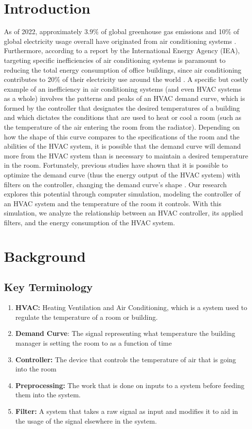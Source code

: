 \documentclass[conference,letterpaper]{IEEEtran}
\begin{document}
\section{Introduction}
\label{sec:Introduction}
As of 2022, approximately $3.9\%$ of global greenhouse gas emissions and 10\% of global electricity usage overall have originated from air conditioning systems \cite{woods_humiditys_2022}. Furthermore, according to a report by the International Energy Agency (IEA), targeting specific inefficiencies of air conditioning systems is paramount to reducing the total energy consumption of office buildings, since air conditioning contributes to 20\% of their electricity use around the world \cite{IEA_Future}. A specific but costly example of an inefficiency in air conditioning systems (and even HVAC systems as a whole) involves the patterns and peaks of an HVAC demand curve, which is formed by the controller that designates the desired temperatures of a building and which dictates the conditions that are used to heat or cool a room (such as the temperature of the air entering the room from the radiator). Depending on how the shape of this curve compares to the specifications of the room and the abilities of the HVAC system, it is possible that the demand curve will demand more from the HVAC system than is necessary to maintain a desired temperature in the room. Fortunately, previous studies have shown that it is possible to optimize the demand curve (thus the energy output of the HVAC system) with filters on the controller, changing the demand curve's shape \cite{6687952} . Our research explores this potential through computer simulation, modeling the controller of an HVAC system and the temperature of the room it controls. With this simulation, we analyze the relationship between an HVAC controller, its applied filters, and the energy consumption of the HVAC system. 

\section{Background}
\label{sec:Background}
\subsection{Key Terminology}
\begin{enumerate}
    \item \textbf{HVAC:} Heating Ventilation and Air Conditioning, which is a system used to regulate the temperature of a room or building.
\item \textbf{Demand Curve}: The signal representing what temperature the building manager is setting the room to as a function of time
\item \textbf{Controller:} The device that controls the temperature of air that is going into the room
\item \textbf{Preprocessing:} The work that is done on inputs to a system before feeding them into the system.
\item \textbf{Filter:} A system that takes a raw signal as input and modifies it to aid in the usage of the signal elsewhere in the system.

\end{enumerate}
\end{document}
